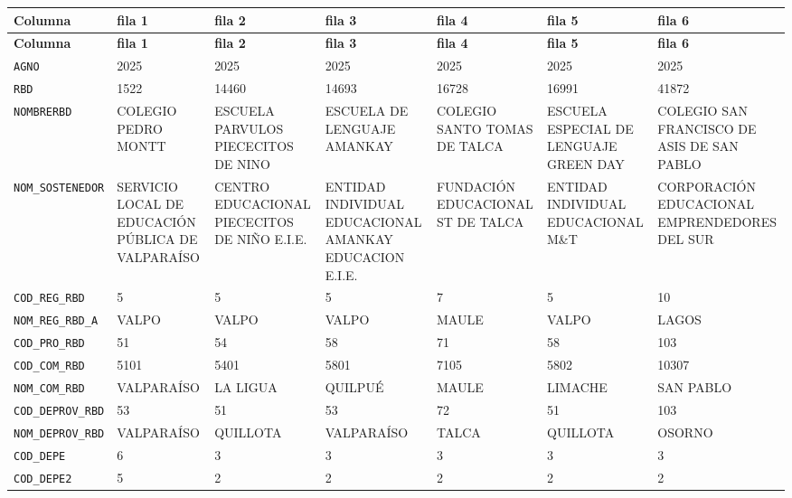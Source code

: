 \documentclass[10pt]{article}
\newcommand{\hdr}[1]{\textbf{\color{white}#1}}
\begin{document}
\footnotesize
\begin{xltabular}{\linewidth}{@{}p{4.3cm} Y Y Y Y Y Y @{}}
\hdr{Columna} & \hdr{fila 1} & \hdr{fila 2} & \hdr{fila 3} & \hdr{fila 4} & \hdr{fila 5} & \hdr{fila 6} \\
\endfirsthead
{}\hdr{Columna} & \hdr{fila 1} & \hdr{fila 2} & \hdr{fila 3} & \hdr{fila 4} & \hdr{fila 5} & \hdr{fila 6} \\
\endhead
{}\texttt{AGNO} & 2025 & 2025 & 2025 & 2025 & 2025 & 2025 \\
\texttt{RBD} & 1522 & 14460 & 14693 & 16728 & 16991 & 41872 \\
\texttt{NOMBRERBD} & COLEGIO PEDRO MONTT & ESCUELA PARVULOS PIECECITOS DE NINO & ESCUELA DE LENGUAJE AMANKAY & COLEGIO SANTO TOMAS DE TALCA & ESCUELA ESPECIAL DE LENGUAJE GREEN DAY & COLEGIO SAN FRANCISCO DE ASIS DE SAN PABLO \\
\texttt{NOM\_\allowbreak{}SOSTENEDOR} & SERVICIO LOCAL DE EDUCACIÓN PÚBLICA DE VALPARAÍSO & CENTRO EDUCACIONAL PIECECITOS DE NIÑO E.I.E. & ENTIDAD INDIVIDUAL EDUCACIONAL AMANKAY EDUCACION E.I.E. & FUNDACIÓN EDUCACIONAL ST DE TALCA & ENTIDAD INDIVIDUAL EDUCACIONAL M\&T & CORPORACIÓN EDUCACIONAL EMPRENDEDORES DEL SUR \\
\texttt{COD\_\allowbreak{}REG\_\allowbreak{}RBD} & 5 & 5 & 5 & 7 & 5 & 10 \\
\texttt{NOM\_\allowbreak{}REG\_\allowbreak{}RBD\_\allowbreak{}A} & VALPO & VALPO & VALPO & MAULE & VALPO & LAGOS \\
\texttt{COD\_\allowbreak{}PRO\_\allowbreak{}RBD} & 51 & 54 & 58 & 71 & 58 & 103 \\
\texttt{COD\_\allowbreak{}COM\_\allowbreak{}RBD} & 5101 & 5401 & 5801 & 7105 & 5802 & 10307 \\
\texttt{NOM\_\allowbreak{}COM\_\allowbreak{}RBD} & VALPARAÍSO & LA LIGUA & QUILPUÉ & MAULE & LIMACHE & SAN PABLO \\
\texttt{COD\_\allowbreak{}DEPROV\_\allowbreak{}RBD} & 53 & 51 & 53 & 72 & 51 & 103 \\
\texttt{NOM\_\allowbreak{}DEPROV\_\allowbreak{}RBD} & VALPARAÍSO & QUILLOTA & VALPARAÍSO & TALCA & QUILLOTA & OSORNO \\
\texttt{COD\_\allowbreak{}DEPE} & 6 & 3 & 3 & 3 & 3 & 3 \\
\texttt{COD\_\allowbreak{}DEPE2} & 5 & 2 & 2 & 2 & 2 & 2 \\

\end{xltabular}
\end{document}
